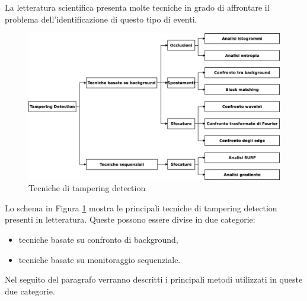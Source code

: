 La letteratura scientifica presenta molte tecniche in grado di affrontare il problema dell'identificazione di questo tipo di eventi.
\begin{figure}[tb]
	\centering
	\includegraphics[width=12cm]{./diagrammi/tecnicheSOA.eps}
	\caption{Tecniche di tampering detection}
	\label{fig:tamperingSOA}
\end{figure}
Lo schema in Figura \ref{fig:tamperingSOA} mostra le principali tecniche di tampering detection presenti in letteratura.
Queste possono essere divise in due categorie: 
\begin{itemize}
	\item tecniche basate su confronto di background,
	\item tecniche basate su monitoraggio sequenziale.
\end{itemize}
Nel seguito del paragrafo verranno descritti i principali metodi utilizzati in queste due categorie.
